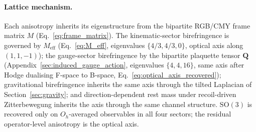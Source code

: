 \paragraph{Lattice mechanism.}
Each anisotropy inherits its eigenstructure from the bipartite RGB/CMY
frame matrix $M$ (Eq.~\ref{eq:frame_matrix}).  The kinematic-sector
birefringence is governed by $M_\text{eff}$ (Eq.~\ref{eq:M_eff},
eigenvalues $\{4/3, 4/3, 0\}$, optical axis along $(1,1,-1)$); the
gauge-sector birefringence by the bipartite plaquette tensor
$\mathbf{Q}$ (Appendix~\ref{sec:induced_gauge_action}, eigenvalues
$\{4, 4, 16\}$, same axis after Hodge dualising
F-space to B-space, Eq.~\ref{eq:optical_axis_recovered});
gravitational birefringence inherits the same axis through the tilted
Laplacian of Section~\ref{sec:gravity}; and direction-dependent rest
mass under recoil-driven Zitterbewegung inherits the axis through the
same channel structure.  $\mathrm{SO}(3)$ is recovered only on
$O_h$-averaged observables in all four sectors; the residual
operator-level anisotropy is the optical axis.

